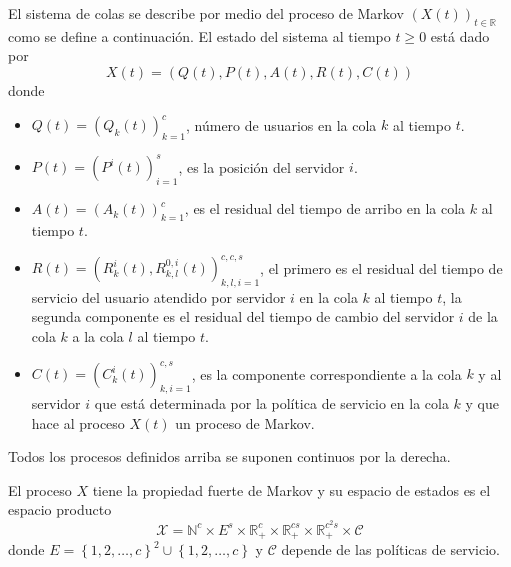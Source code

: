 \documentclass{article}
\newcommand{\nat}{\mathbb{N}}
\newcommand{\rea}{\mathbb{R}}
\numberwithin{equation}{section}
\begin{document}
El sistema de colas se describe por medio del proceso de Markov
$\left(X\left(t\right)\right)_{t\in\rea}$ como se define a
continuaci\'on. El estado del sistema al tiempo $t\geq0$ est\'a dado
por
\[X\left(t\right)=\left(Q\left(t\right),P\left(t\right),A\left(t\right),R\left(t\right),C\left(t\right)\right)\]
donde
\begin{itemize}
\item
$Q\left(t\right)=\left(Q_{k}\left(t\right)\right)_{k=1}^{c}$,
n\'umero de usuarios en la cola $k$ al tiempo $t$. \item
$P\left(t\right)=\left(P^{i}\left(t\right)\right)_{i=1}^{s}$, es
la posici\'on del servidor $i$. \item
$A\left(t\right)=\left(A_{k}\left(t\right)\right)_{k=1}^{c}$, es
el residual del tiempo de arribo en la cola $k$ al tiempo $t$.
\item
$R\left(t\right)=\left(R_{k}^{i}\left(t\right),R_{k,l}^{0,i}\left(t\right)\right)_{k,l,i=1}^{c,c,s}$,
el primero es el residual del tiempo de servicio del usuario
atendido por servidor $i$ en la cola $k$ al tiempo $t$, la segunda
componente es el residual del tiempo de cambio del servidor $i$ de
la cola $k$ a la cola $l$ al tiempo $t$. \item
$C\left(t\right)=\left(C_{k}^{i}\left(t\right)\right)_{k,i=1}^{c,s}$,
es la componente correspondiente a la cola $k$ y al servidor $i$
que est\'a determinada por la pol\'itica de servicio en la cola $k$
y que hace al proceso $X\left(t\right)$ un proceso de Markov.
\end{itemize}
Todos los procesos definidos arriba se suponen continuos por la
derecha.

El proceso $X$ tiene la propiedad fuerte de Markov y su espacio de
estados es el espacio producto
\[\mathcal{X}=\nat^{c}\times E^{s}\times \rea_{+}^{c}\times\rea_{+}^{cs}\times\rea_{+}^{c^{2}s}\times \mathcal{C}\] donde $E=\left\{1,2,\ldots,c\right\}^{2}\cup\left\{1,2,\ldots,c\right\}$ y $\mathcal{C}$  depende de las pol\'iticas de servicio.
\end{document}
